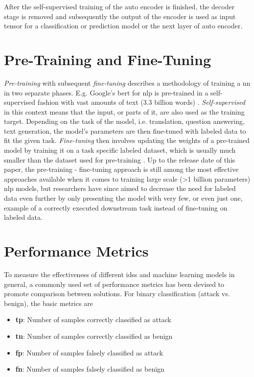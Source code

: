 After the self-supervised training of the auto encoder is finished, the decoder stage is removed and subsequently the output of the encoder is used as input tensor for a classification or prediction model or the next layer of auto encoder. 

\section{Pre-Training and Fine-Tuning}

\textit{Pre-training} with subsequent \textit{fine-tuning} describes a methodology of training a \gls{nn} in two separate phases. E.g. Google's \gls{bert} for \gls{nlp} is pre-trained in a self-supervised fashion with vast amounts of text (3.3 billion words) \cite{bert}. \textit{Self-supervised} in this context means that the input, or parts of it, are also used as the training target. Depending on the task of the model, i.e. translation, question answering, text generation, the model's parameters are then fine-tuned with labeled data to fit the given task. \textit{Fine-tuning} then involves updating the weights of a pre-trained model by training it on a task specific labeled dataset, which is usually much smaller than the dataset used for pre-training \cite{gpt3}. Up to the release date of this paper, the pre-training - fine-tuning approach is still among the most effective approaches available when it comes to training large scale (>1 billion parameters) \gls{nlp} models, but researchers have since aimed to decrease the need for labeled data even further by only presenting the model with very few, or even just one, example of a correctly executed downstream task \cite{gpt3} instead of fine-tuning on labeled data.

\section{Performance Metrics} \label{sec:background:metrics}

To measure the effectiveness of different \glspl{ids} and machine learning models in general, a commonly used set of performance metrics has been devised to promote comparison between solutions. For binary classification (attack vs. benign), the basic metrics are

\begin{itemize}
	\item \textbf{\gls{tp}}: Number of samples correctly classified as attack
	\item \textbf{\gls{tn}}: Number of samples correctly classified as benign
	\item \textbf{\gls{fp}}: Number of samples falsely classified as attack
	\item \textbf{\gls{fn}}: Number of samples falsely classified as benign
\end{itemize}


